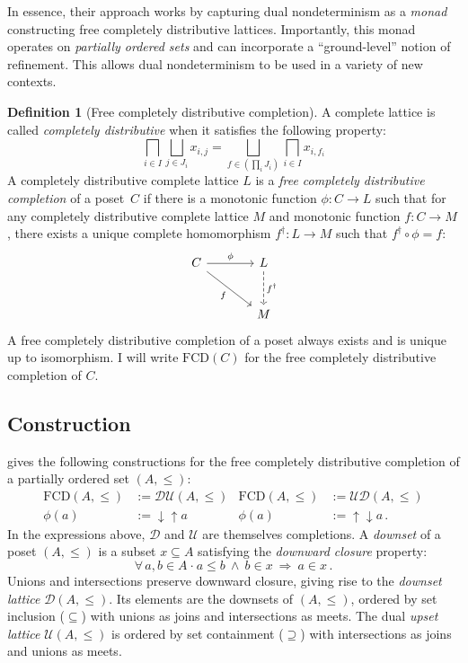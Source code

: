 \documentclass[11pt,oneside]{book}
\theoremstyle{definition}
\newtheorem{definition}[theorem]{Definition}
\newcommand{\bdot}{\boldsymbol{\cdot}}
\begin{document}
In essence,
their approach works by
capturing dual nondeterminism as a \emph{monad}
constructing free completely distributive lattices.
Importantly,
this monad operates on \emph{partially ordered sets}
and can incorporate
a ``ground-level'' notion of refinement.
This allows dual nondeterminism to be used
in a variety of new contexts.

\begin{definition}[Free completely distributive completion] \label{def:fcd}
A complete lattice is called \emph{completely distributive}
when it satisfies the following property:
\[
    \bigsqcap_{i \in I} \bigsqcup_{j \in J_i} x_{i,j} =
    \bigsqcup_{f \in (\prod_i J_i)} \bigsqcap_{i \in I} x_{i, f_i}
\]
A completely distributive complete lattice $L$ is a
\emph{free completely distributive completion} of
a poset~$C$ if there is
a monotonic function $\phi : C \rightarrow L$
such that
for any completely distributive complete lattice $M$
and monotonic function $f : C \rightarrow M$,
there exists a unique complete homomorphism
$f^\dagger : L \rightarrow M$
such that
$f^\dagger \circ \phi = f$:
\[
  \begin{tikzcd}[sep=large]
    C \arrow[r, "\phi"] \arrow[rd, "f"'] &
    L \arrow[d, "f^\dagger", dashed] \\ & M
  \end{tikzcd}
\]
A free completely distributive completion of a poset
always exists and is unique up to isomorphism.
I will write $\mathrm{FCD}(C)$ for
the free completely distributive completion of $C$.
\end{definition}

\subsection{Construction} %

\citet{augtyp} gives the following constructions for
the free completely distributive completion of
a partially ordered set $(A, \le)$:
\begin{align*}
  \mathrm{FCD}(A, {\le}) &:= \mathcal{D} \mathcal{U}(A, {\le}) &
  \mathrm{FCD}(A, {\le}) &:= \mathcal{U} \mathcal{D}(A, {\le}) \\
  \phi(a) &:= {\downarrow}{\uparrow} a &
  \phi(a) &:= {\uparrow}{\downarrow} a \,.
\end{align*}
In the expressions above,
$\mathcal{D}$ and $\mathcal{U}$
are themselves completions.
A \emph{downset} of a poset $(A, {\le})$
is a subset $x \subseteq A$ satisfying
the \emph{downward closure} property:
\[
  \forall \, a, b \in A \: \bdot \:
          a \le b \: \wedge \: b \in x \: \Rightarrow \: a \in x \,.
\]
Unions and intersections preserve downward closure,
giving rise to the \emph{downset lattice} $\mathcal{D}(A, {\le})$.
Its elements are the downsets of $(A, {\le})$,
ordered by set inclusion (${\subseteq}$) with
unions as joins and intersections as meets.
The dual \emph{upset lattice} $\mathcal{U}(A, {\le})$
is ordered by set containment (${\supseteq}$) with
intersections as joins and unions as meets.
\end{document}
